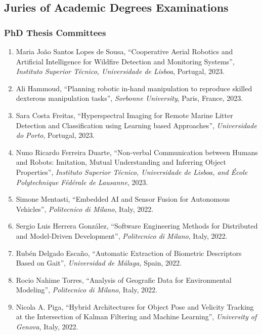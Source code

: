 \documentclass[
]{article}
\begin{document}
\subsection{Juries of Academic Degrees
Examinations}\label{juries-of-academic-degrees-examinations}

\subsubsection{PhD Thesis Committees}\label{phd-thesis-committees}

\begin{enumerate}
\def\labelenumi{\arabic{enumi}.}
\item
  Maria João Santos Lopes de Sousa, ``Cooperative Aerial Robotics and
  Artificial Intelligence for Wildfire Detection and Monitoring
  Systems'', \emph{Instituto Superior Técnico, Universidade de Lisboa},
  Portugal, 2023.
\item
  Ali Hammoud, ``Planning robotic in-hand manipulation to reproduce
  skilled dexterous manipulation tasks'', \emph{Sorbonne University},
  Paris, France, 2023.
\item
  Sara Costa Freitas, ``Hyperspectral Imaging for Remote Marine Litter
  Detection and Classification using Learning based Approaches'',
  \emph{Universidade do Porto}, Portugal, 2023.
\item
  Nuno Ricardo Ferreira Duarte, ``Non-verbal Communication between
  Humans and Robots: Imitation, Mutual Understanding and Inferring
  Object Properties'', \emph{Instituto Superior Técnico, Universidade de
  Lisboa, and École Polytechnique Fédérale de Lausanne}, 2023.
\item
  Simone Mentasti, ``Embedded AI and Sensor Fusion for Autonomous
  Vehicles'', \emph{Politecnico di Milano}, Italy, 2022.
\item
  Sergio Luis Herrera González, ``Software Engineering Methods for
  Distributed and Model-Driven Development'', \emph{Politecnico di
  Milano}, Italy, 2022.
\item
  Rubén Delgado Escaño, ``Automatic Extraction of Biometric Descriptors
  Based on Gait'', \emph{Universidad de Málaga,} Spain, 2022.
\item
  Rocio Nahime Torres, ``Analysis of Geografic Data for Environmental
  Modeling'', \emph{Politecnico di Milano}, Italy, 2022.
\item
  Nicola A. Piga, ``Hybrid Architectures for Object Pose and Velicity
  Tracking at the Intersection of Kalman Filtering and Machine
  Learning'', \emph{University of Genova}, Italy, 2022.

\end{enumerate}
\end{document}
